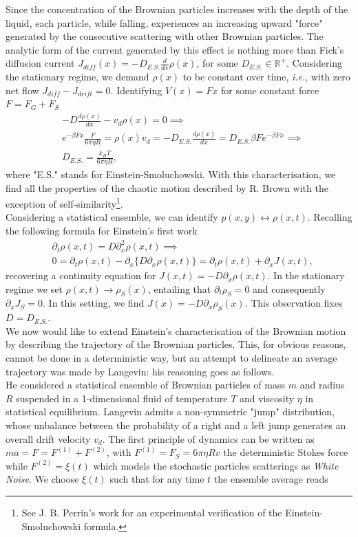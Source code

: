 Since the concentration of the Brownian particles increases with the depth of the liquid, each particle, while falling, experiences an increasing upward "force" generated by the consecutive scattering with other Brownian particles. The analytic form of the current generated by this effect is nothing more than Fick's diffusion current $J_{diff}(x)=-D_{E.S.}\frac{d}{dx}\rho(x)$, for some $D_{E.S.}\in \mathbb{R}^+$. Considering the stationary regime, we demand $\rho(x)$ to be constant over time, \textit{i.e.}, with zero net flow $J_{diff}-J_{drift}=0$. Identifying $V(x)=Fx$ for some constant force $F=F_G+F_S$
\begin{align*}
	& -D\frac{d\rho(x)}{dx}-v_d\rho(x)=0 \implies\\
	& e^{-\beta Fx}\frac{F}{6\pi \eta R}=\rho(x)v_d=-D_{E.S.}\frac{d\rho(x)}{dx}=D_{E.S.}\beta F e^{-\beta F x}\implies\\
	& D_{E.S.} =\frac{k_BT}{6\pi\eta R},
\end{align*}
where "E.S." stands for Einstein-Smoluchowski. With this characterisation, we find all the properties of the chaotic motion described by R. Brown with the exception of self-similarity\footnote{See J. B. Perrin's work for an experimental verification of the Einstein-Smoluchowski formula.}.\\
Considering a statistical ensemble, we can identify $p(x,y)\leftrightarrow \rho(x,t)$. Recalling the following formula for Einstein's first work
\begin{align*}
	& \partial_t\rho(x,t)=D\partial_x^2\rho(x,t)\implies\\
	& 0=\partial_t\rho(x,t)-\partial_x\{D\partial_x\rho(x,t)\}=\partial_t\rho(x,t)+\partial_x J(x,t),
\end{align*}
recovering a continuity equation for $J(x,t)=-D\partial_x\rho(x,t)$. In the stationary regime we set $\rho(x,t)\to \rho_S(x)$, entailing that $\partial_t\rho_S=0$ and consequently $\partial_xJ_S=0$. In this setting, we find $J(x)=-D\partial_x\rho_S(x)$. This observation fixes $D=D_{E.S.}$.\\
We now would like to extend Einstein's characterisation of the Brownian motion by describing the trajectory of the Brownian particles. This, for obvious reasons, cannot be done in a deterministic way, but an attempt to delineate an average trajectory was made by Langevin: his reasoning goes as follows.\\
He considered a statistical ensemble of Brownian particles of mass $m$ and radius $R$ suspended in a 1-dimensional fluid of temperature $T$ and viscosity $\eta$ in statistical equilibrium. Langevin admits a non-symmetric "jump" distribution, whose unbalance between the probability of a right and a left jump generates an overall drift velocity $v_d$. The first principle of dynamics can be written as $ma=F=F^{(1)}+F^{(2)}$, with $F^{(1)}=F_S=6\pi\eta Rv$ the deterministic Stokes force while $F^{(2)}=\xi(t)$ which models the stochastic particles scatterings as \textit{White Noise}. We choose $\xi(t)$ such that for any time $t$ the ensemble average reads
